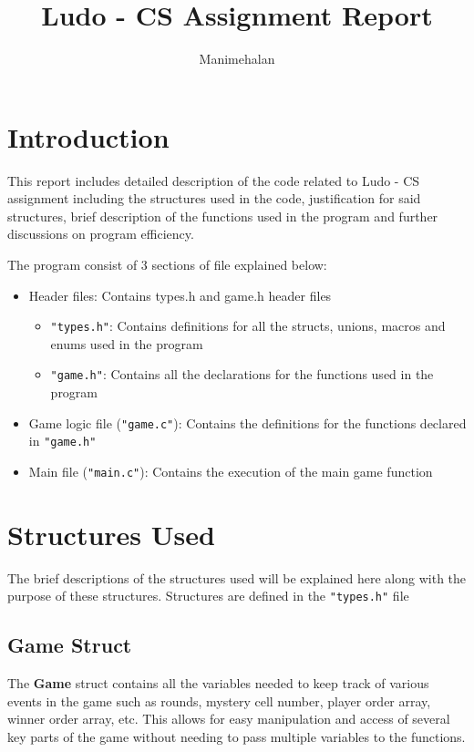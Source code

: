 \documentclass[12pt, a4paper]{report}
\title{\Huge Ludo - CS Assignment Report}
\author{Manimehalan}
\begin{document}
\maketitle

\tableofcontents  %

\chapter{Introduction}
This report includes detailed description of the code related to Ludo - CS assignment including the structures used in the code, justification for said structures, brief description of the functions used in the program and further discussions on program efficiency.

The program consist of 3 sections of file explained below:

\begin{itemize}[itemsep=5pt, left=5pt, label=\textbullet]
    \item Header files: Contains types.h and game.h header files
    	\begin{itemize}
    		\item \lstinline|"types.h"|: Contains definitions for all the structs, unions, macros and enums used in the program
    		\item \lstinline|"game.h"|: Contains all the declarations for the functions used in the program
    	\end{itemize}
    \item Game logic file (\lstinline|"game.c"|): Contains the definitions for the functions declared in \lstinline|"game.h"|
    \item Main file (\lstinline|"main.c"|): Contains the execution of the main game function
\end{itemize}

\chapter{Structures Used}
The brief descriptions of the structures used will be explained here along with the purpose of these structures. Structures are defined in the \lstinline|"types.h"| file

\section{Game Struct}
The \textbf{Game} struct contains all the variables needed to keep track of various events in the game such as rounds, mystery cell number, player order array, winner order array, etc. This allows for easy manipulation and access of several key parts of the game without needing to pass multiple variables to the functions.
\end{document}
